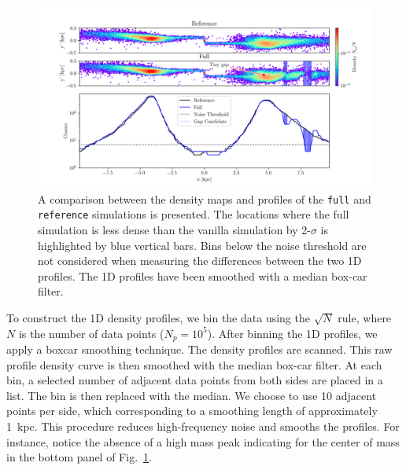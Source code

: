 \documentclass{aa}
\begin{document}
\begin{appendix}
    \begin{figure}
      \centering
      \includegraphics[width=\linewidth, trim=20 0 15 0]{monte-carlo-009-pouliasis2017pii-GCNBody-2000-milisigma-5-noisefactor-20-boxcarindexlength-shifted-0.png}
      \caption{A comparison between the density maps and profiles of the \texttt{full} and \texttt{reference} simulations is presented. The locations where the full simulation is less dense than the vanilla simulation by 2-$\sigma$ is highlighted by blue vertical bars. Bins below the noise threshold are not considered when measuring the differences between the two 1D profiles. The 1D profiles have been smoothed with a median box-car filter.}
      \label{fig:profiles}
      \end{figure}

    To construct the 1D density profiles, we bin the data using the $\sqrt{N}$ rule, where $N$ is the number of data points ($N_p = 10^5$). After binning the 1D profiles, we apply a boxcar smoothing technique. The density profiles are scanned. This raw profile density curve is then smoothed with the median box-car filter. At each bin, a selected number of adjacent data points from both sides are placed in a list. The bin is then replaced with the median. We choose to use 10 adjacent points per side, which corresponding to a smoothing length of approximately 1~kpc. This procedure reduces high-frequency noise and smooths the profiles. For instance, notice the absence of a high mass peak indicating for the center of mass in the bottom panel of Fig.~\ref{fig:profiles}.


\end{appendix}
\end{document}
